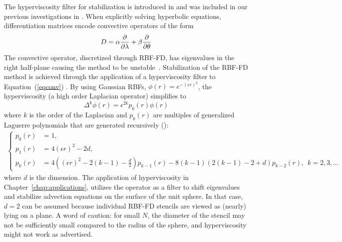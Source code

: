 \documentclass[11pt]{report}
\begin{document}
{The hyperviscosity filter for stabilization is introduced in \cite{FornbergLehto11} and was included in our previous investigations in \cite{BolligFlyerErlebacher2012}.
When explicitly solving hyperbolic equations, differentiation matrices encode convective operators of the form 
\begin{equation}
D = \alpha \frac{\partial }{\partial \lambda} + \beta \frac{\partial }{\partial \theta} \label{eqconv}
\end{equation}
The convective operator, discretized
through RBF-FD, has eigenvalues  
 in the right half-plane causing the method to be unstable~\cite{FornbergLehto11, FlyerLehto11}.  
Stabilization of the RBF-FD method is achieved through the application of a hyperviscosity filter 
to Equation~(\ref{eqconv}) \cite{FornbergLehto11}. By using Gaussian 
 RBFs, $\phi(r) = e^{-(\epsilon r)^2}$, the hyperviscosity (a high order Laplacian operator) simplifies to
\begin{equation}
\Delta^{k}\phi(r) = \epsilon^{2k} p_k(r) \phi(r)
\label{eqn:gaussian_hv}
\end{equation}
where $k$ is the order of the Laplacian and  $p_k(r)$ are multiples of generalized Laguerre polynomials that
are generated recursively (\cite{FornbergLehto11}):
\begin{align*}
\begin{cases} 
p_0(r) &=1, \\
p_1(r) &= 4(\epsilon r)^2 - 2d, \\
p_k(r) &= 4((\epsilon r)^2 - 2(k-1) - \frac{d}{2})  p_{k-1}(r) - 8(k-1)(2(k-1) - 2 + d) p_{k-2}(r), \ \ k = 2, 3, ...
\end{cases}
\end{align*}
where $d$ is the dimension. The application of hyperviscosity in Chapter~\ref{chap:applications}, utilizes the operator as a filter to shift eigenvalues and stabilize advection equations on the surface of the unit sphere. In that case, $d=2$ can be assumed because individual RBF-FD stencils are viewed as (nearly) lying on a plane. A word of caution: for small $N$, the diameter of the stencil may not be sufficiently 
small compared to the radius of the sphere, and hyperviscosity might not work as advertised. 

}
\end{document}
